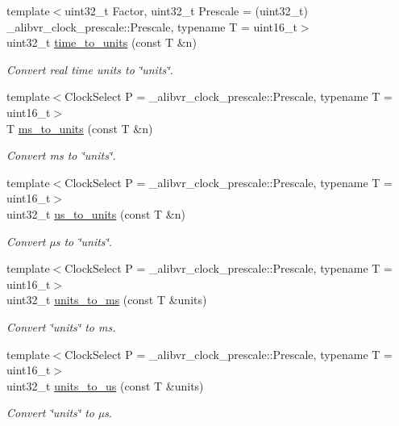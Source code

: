 \begin{DoxyCompactItemize}
{\footnotesize template$<$uint32\+\_\+t Factor, uint32\+\_\+t Prescale = (uint32\+\_\+t) \+\_\+alibvr\+\_\+clock\+\_\+prescale\+::\+Prescale, typename T  = uint16\+\_\+t$>$ }\\uint32\+\_\+t \hyperlink{namespaceclock_a46fd6e3a91d0b307eeea0500d03d12fb}{time\+\_\+to\+\_\+units} (const T \&n)
\begin{DoxyCompactList}\small\item\em Convert real time units to \char`\"{}units\char`\"{}. \end{DoxyCompactList}\item 
{\footnotesize template$<$Clock\+Select P = \+\_\+alibvr\+\_\+clock\+\_\+prescale\+::\+Prescale, typename T  = uint16\+\_\+t$>$ }\\T \hyperlink{namespaceclock_a2e5ca91b796d0c96b8094ba1441daedc}{ms\+\_\+to\+\_\+units} (const T \&n)
\begin{DoxyCompactList}\small\item\em Convert ms to \char`\"{}units\char`\"{}. \end{DoxyCompactList}\item 
{\footnotesize template$<$Clock\+Select P = \+\_\+alibvr\+\_\+clock\+\_\+prescale\+::\+Prescale, typename T  = uint16\+\_\+t$>$ }\\uint32\+\_\+t \hyperlink{namespaceclock_ac07c7dca2d34cd417aa968fa2ccab83b}{us\+\_\+to\+\_\+units} (const T \&n)
\begin{DoxyCompactList}\small\item\em Convert µs to \char`\"{}units\char`\"{}. \end{DoxyCompactList}\item 
{\footnotesize template$<$Clock\+Select P = \+\_\+alibvr\+\_\+clock\+\_\+prescale\+::\+Prescale, typename T  = uint16\+\_\+t$>$ }\\uint32\+\_\+t \hyperlink{namespaceclock_a64b11929624655a5ac990b12829c8606}{units\+\_\+to\+\_\+ms} (const T \&units)
\begin{DoxyCompactList}\small\item\em Convert \char`\"{}units\char`\"{} to ms. \end{DoxyCompactList}\item 
{\footnotesize template$<$Clock\+Select P = \+\_\+alibvr\+\_\+clock\+\_\+prescale\+::\+Prescale, typename T  = uint16\+\_\+t$>$ }\\uint32\+\_\+t \hyperlink{namespaceclock_ad223db3a13e650f8e16585cde9ff08ac}{units\+\_\+to\+\_\+us} (const T \&units)
\begin{DoxyCompactList}\small\item\em Convert \char`\"{}units\char`\"{} to µs. \end{DoxyCompactList}\item 

\end{DoxyCompactItemize}
